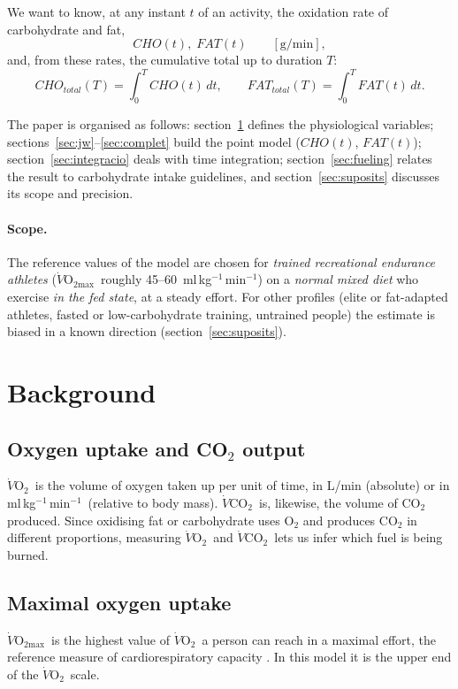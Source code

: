 \documentclass[10pt,a4paper]{article}
\newcommand{\VO}{\ensuremath{\dot V\mathrm{O_2}}}
\newcommand{\VCO}{\ensuremath{\dot V\mathrm{CO_2}}}
\newcommand{\VOmax}{\ensuremath{\dot V\mathrm{O_{2max}}}}
\newcommand{\mlkgmin}{ml\,kg$^{-1}$\,min$^{-1}$}
\begin{document}
We want to know, at any instant $t$ of an activity, the oxidation rate of carbohydrate and
fat,
\begin{equation}
  CHO(t),\; FAT(t) \qquad [\mathrm{g/min}],
\end{equation}
and, from these rates, the cumulative total up to duration $T$:
\begin{equation}
  CHO_{total}(T)=\int_0^T CHO(t)\,dt, \qquad
  FAT_{total}(T)=\int_0^T FAT(t)\,dt .
  \label{eq:integral}
\end{equation}

The paper is organised as follows: section~\ref{sec:conceptes} defines the physiological
variables; sections~\ref{sec:jw}--\ref{sec:complet} build the point model ($CHO(t)$,
$FAT(t)$); section~\ref{sec:integracio} deals with time integration;
section~\ref{sec:fueling} relates the result to carbohydrate intake guidelines, and
section~\ref{sec:suposits} discusses its scope and precision.

\paragraph{Scope.} The reference values of the model are chosen for \emph{trained
recreational endurance athletes} (\VOmax\ roughly 45--60~\mlkgmin) on a \emph{normal mixed
diet} who exercise \emph{in the fed state}, at a steady effort. For other profiles (elite or
fat-adapted athletes, fasted or low-carbohydrate training, untrained people) the estimate
is biased in a known direction (section~\ref{sec:suposits}).

\section{Background}\label{sec:conceptes}

\subsection{Oxygen uptake and CO$_2$ output}
\VO\ is the volume of oxygen taken up per unit of time, in L/min (absolute) or in
\mlkgmin\ (relative to body mass). \VCO\ is, likewise, the volume of CO$_2$ produced.
Since oxidising fat or carbohydrate uses O$_2$ and produces CO$_2$ in different
proportions, measuring \VO\ and \VCO\ lets us infer which fuel is being burned.

\subsection{Maximal oxygen uptake}
\VOmax\ is the highest value of \VO\ a person can reach in a maximal effort, the reference
measure of cardiorespiratory capacity \citep{bassett2000}. In this model it is the upper end
of the \VO\ scale.
\end{document}
